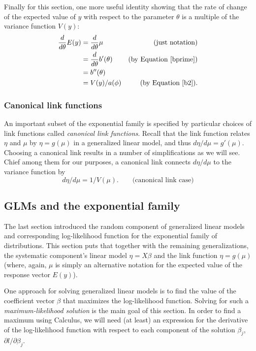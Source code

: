 \documentclass[10pt]{article} %
\begin{document}
Finally for this section, one more useful identity showing that the
rate of change of the expected value of $y$ with respect to the parameter $\theta$
is a multiple of the variance function $V(y)$:
\begin{align}
\frac{d}{d\theta}E(y) &= \frac{d}{d\theta}\mu &\mbox{(just notation)}\nonumber\\
&= \frac{d}{d\theta}b'(\theta) &\mbox{(by Equation \ref{bprime})}\nonumber\\
&= b''(\theta)\nonumber\\
&= V(y)/a(\phi)\label{mutheta} &\mbox{(by Equation \ref{b2})}.
\end{align}

\subsubsection*{Canonical link functions}

An important subset of the exponential family is specified by particular
choices of link functions called \emph{canonical link functions}.  Recall that
the link function relates $\eta$ and $\mu$ by $\eta=g(\mu)$ in a generalized
linear model, and thus $d\eta/d\mu = g'(\mu)$. Choosing a canonical link
results in a number of simplifications as we will see. Chief among them for our
purposes, a canonical link connects $d\eta/d\mu$ to the variance function by
\begin{equation}
\label{canonical}
{d\eta}/{d\mu}={1}/{V(\mu)}.\qquad\mbox{(canonical link case)}
\end{equation}



\subsection*{GLMs and the exponential family}

The last section introduced the random component of generalized linear models
and corresponding log-likelihood function for the exponential family of
distributions.  This section puts that together with the remaining
generalizations, the systematic component's linear model $\eta = X\beta$ and
the link function $\eta=g(\mu)$ (where, again, $\mu$ is simply an alternative
notation for the expected value of the response vector $E(y)$).

One approach for solving generalized linear models is to find the value of the
coefficient vector $\beta$ that maximizes the log-likelihood function. Solving
for such a \emph{maximum-likelihood solution} is the main goal of this section.
In order to find a maximum using Calculus, we will need (at least) an
expression for the derivative of the log-likelihood function with respect to
each component of the solution $\beta_j$, $\partial{l}/\partial{\beta_j}$.
\end{document}
